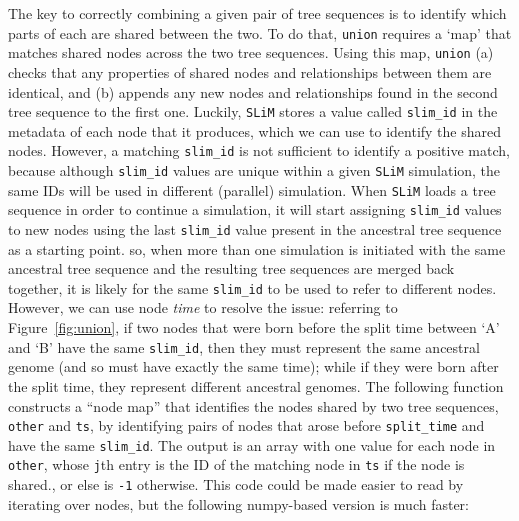 \documentclass[12pt]{article}
\newcommand{\slim}[0]{\texttt{SLiM}\xspace}
\begin{document}
The key to correctly combining a given pair of tree sequences is to identify which parts of each are shared between the two.
To do that, \verb|union| requires a `map' that matches shared nodes across the two tree sequences.
Using this map, \verb|union| (a) checks that any properties of shared nodes and relationships between them are identical, and
(b) appends any new nodes and relationships found in the second tree sequence to the first one.
Luckily, \slim stores a value called \verb|slim_id| in the metadata of each node that it produces,
which we can use to identify the shared nodes.
However, a matching \verb|slim_id| is not sufficient to identify a positive match,
because although \verb|slim_id| values are unique within a given \slim simulation,
the same IDs will be used in different (parallel) simulation.
When \slim loads a tree sequence in order to continue a simulation,
it will start assigning \verb|slim_id| values to new nodes using the last \verb|slim_id| value
present in the ancestral tree sequence as a starting point.
so, when more than one simulation is initiated with the same
ancestral tree sequence and the resulting tree sequences are merged back together, it is likely for the same \verb|slim_id| to be used to refer to different nodes.
However, we can use node \emph{time} to resolve the issue:
referring to Figure~\ref{fig:union}, if two nodes that were born before the split time between `A' and `B'
have the same \verb|slim_id|, then they must represent the same ancestral genome (and so must have exactly the same time);
while if they were born after the split time, they represent different ancestral genomes.
The following function constructs a ``node map'' that identifies the nodes shared by two tree sequences, \verb|other| and \verb|ts|,
by identifying pairs of nodes that arose before \verb|split_time| and have the same \verb|slim_id|.
The output is an array with one value for each node in \verb|other|,
whose \verb|j|th entry is the ID of the matching node in \verb|ts| if the node is shared.,
or else is \verb|-1| otherwise.
This code could be made easier to read by iterating over nodes,
but the following numpy-based version is much faster:
\end{document}
